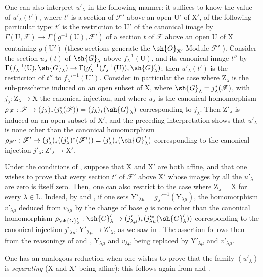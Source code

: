 \begin{env}[11.9.5]
One can also interpret $u'_\lambda$ in the following manner: it suffices to know the value of $u'_\lambda(t')$, where $t'$ is a section of $\mathscr{F}'$ above an open $\mathrm{U}'$ of $\mathrm{X}'$, of the following particular type: $t'$ is the restriction to $\mathrm{U}'$ of the canonical image by $\Gamma(\mathrm{U},\mathscr{F})\to\Gamma(g^{-1}(\mathrm{U}),\mathscr{F}')$ of a section $t$ of $\mathscr{F}$ above an open $\mathrm{U}$ of $\mathrm{X}$ containing $g(\mathrm{U}')$ (these sections generate the $\sh{O}_{\mathrm{X}'}$-Module $\mathscr{F}'$ ).
Consider the section $u_\lambda(t)$ of $\sh{G}_\lambda$ above $f_\lambda^{-1}(\mathrm{U})$, and its canonical image $t''$ by $\Gamma(f_\lambda^{-1}(\mathrm{U}),\sh{G}_\lambda)\to\Gamma(g_\lambda'^{-1}(f_\lambda^{-1}(\mathrm{U})),\sh{G}'_\lambda)$; then $u'_\lambda(t')$ is the restriction of $t''$ to $f_\lambda'^{-1}(\mathrm{U}')$.
Consider in particular the case where $\mathrm{Z}_\lambda$ is the sub-prescheme induced on an open subset of $\mathrm{X}$, where $\sh{G}_\lambda=j_\lambda^*(\mathscr{F})$, with $j_\lambda:\mathrm{Z}_\lambda\to\mathrm{X}$ the canonical injection, and where $u_\lambda$ is the canonical homomorphism $\rho_\mathscr{F}:\mathscr{F}\to(j_\lambda)_*(j_\lambda^*(\mathscr{F}))=(j_\lambda)_*(\sh{G}_\lambda)$  corresponding to $j_\lambda$.
Then $\mathrm{Z}'_\lambda$ is induced on an open subset of $\mathrm{X}'$, and the preceding interpretation shows that $u'_\lambda$ is none other than the canonical homomorphism $\rho_{\mathscr{F}'}:\mathscr{F}'\to(j'_\lambda)_*((j'_\lambda)^*(\mathscr{F}'))=(j'_\lambda)_*(\sh{G}'_\lambda)$ corresponding to the canonical injection $j'_\lambda:\mathrm{Z}'_\lambda\to\mathrm{X}'$.
\end{env}

\begin{env}[11.9.6]
\label{IV.11.9.6}
Under the conditions of , suppose that $\mathrm{X}$ and $\mathrm{X}'$ are both affine, and that one wishes to prove that every section $t'$ of $\mathscr{F}'$ above $\mathrm{X}'$ whose images by all the $u'_\lambda$ are zero is itself zero.
Then, one can also restrict to the case where $\mathrm{Z}_\lambda=\mathrm{X}$ for every $\lambda\in\mathrm{L}$.
Indeed, by  and , if one sets $\mathrm{Y}'_{\lambda\mu}=g_\lambda'^{-1}(\mathrm{Y}_{\lambda\mu})$, the homomorphism $v'_{\lambda\mu}$ deduced from $v_{\lambda\mu}$ by the change of base $g$ is none other than the canonical homomorphism
$\rho_{\sh{G}'_\lambda}:\sh{G}'_\lambda\to(j'_{\lambda\mu})_*(j_{\lambda\mu}'^*(\sh{G}'_\lambda))$ corresponding to the canonical injection $j'_{\lambda\mu}:\mathrm{Y}'_{\lambda\mu}\to\mathrm{Z}'_\lambda$, as we saw in .
The assertion follows then from the reasonings of  and , $\mathrm{Y}_{\lambda\mu}$ and $v_{\lambda\mu}$ being replaced by $\mathrm{Y}'_{\lambda\mu}$ and $v'_{\lambda\mu}$.

One has an analogous reduction when one wishes to prove that the family $(u'_\lambda)$ is \emph{separating} ($\mathrm{X}$ and $\mathrm{X}'$ being affine): this follows again from  and .
\end{env}

